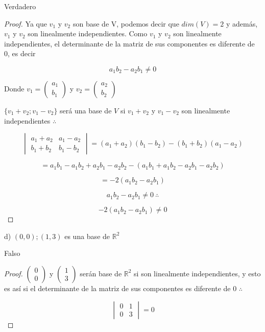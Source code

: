 \documentclass[12pt]{article}
\begin{document}
Verdadero
\begin{proof}
Ya que $v_{1}$ y $v_{2}$ son base de V, podemos decir que $dim(V) = 2$ y además, $v_{1}$ y $v_{2}$ son linealmente independientes. Como $v_{1}$ y $v_{2}$ son linealmente independientes, el determinante de la matriz de sus componentes es diferente de 0, es decir

$$a_{1}b_{2} - a_{2}b_{1} \neq 0$$
\bigskip

Donde $v_{1} = \begin{pmatrix} a_{1}\\ b_{1} \end{pmatrix}$ y $v_{2} = \begin{pmatrix} a_{2}\\ b_{2} \end{pmatrix}$

$\{ v_{1} + v_{2}; v_{1} - v_{2} \}$ será una base de $V$ si $v_{1} + v_{2}$ y $v_{1} - v_{2}$ son linealmente independientes $\therefore$

$$\begin{vmatrix} a_{1} + a_{2} & a_{1} - a_{2}\\  b_{1} + b_{2} & b_{1} - b_{2} \end{vmatrix} = (a_{1} + a_{2})(b_{1} - b_{2}) - (b_{1} + b_{2})(a_{1} - a_{2})$$

$$ = a_{1}b_{1} - a_{1}b_{2} + a_{2}b_{1} - a_{2}b_{2} - (a_{1}b_{1} + a_{1}b_{2} - a_{2}b_{1} - a_{2}b_{2})$$

$$ = -2(a_{1}b_{2} - a_{2}b_{1})$$

$$a_{1}b_{2} - a_{2}b_{1} \neq 0 \ \therefore$$

$$-2(a_{1}b_{2} - a_{2}b_{1}) \neq 0$$

\end{proof}
\bigskip

d) $(0,0); (1,3)$ es una base de $\mathbb{R}^2$
\bigskip

Falso
\begin{proof}
$\begin{pmatrix} 0\\ 0 \end{pmatrix}$ y $\begin{pmatrix} 1\\ 3 \end{pmatrix}$ serán base de $\mathbb{R}^2$ si son linealmente independientes, y esto es así si el determinante de la matriz de sus componentes es diferente de 0 $\therefore$

$$\begin{vmatrix} 0 & 1\\ 0 & 3 \end{vmatrix} = 0$$

\end{proof}
\end{document}
